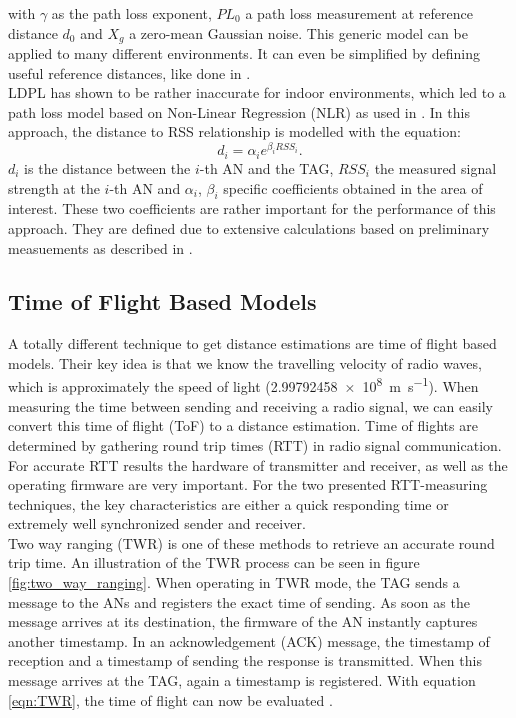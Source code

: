 with $\gamma$ as the path loss exponent, $PL_{0}$ a path loss measurement at reference distance $d_0$ and $X_{g}$ a zero-mean Gaussian noise. This generic model can be applied to many different environments. It can even be simplified by defining useful reference distances, like done in \cite{Kurt}.\\
\noindent\hspace*{5mm}%
LDPL has shown to be rather inaccurate for indoor environments, which led to a path loss model based on Non-Linear Regression (NLR) as used in \cite{ZanLi}. In this approach, the distance to RSS relationship is modelled with the equation:
\begin{equation}
d_{i} = \alpha_{i} e^{\beta_{i}RSS_{i}}.
\label{eqn:NLR}
\end{equation}
$d_{i}$ is the distance between the $i$-th AN and the TAG, $RSS_{i}$ the measured signal strength at the $i$-th AN and $\alpha_{i}$, $\beta_{i}$ specific coefficients obtained in the area of interest. These two coefficients are rather important for the performance of this approach. They are defined due to extensive calculations based on preliminary measuements as described in \cite{Kurt}.


\subsection{Time of Flight Based Models}
A totally different technique to get distance estimations are time of flight based models. Their key idea is that we know the travelling velocity of radio waves, which is approximately the speed of light (\SI{2.99792458e8}{\meter\per\second}). When measuring the time between sending and receiving a radio signal, we can easily convert this time of flight (ToF) to a distance estimation. Time of flights are determined by gathering round trip times (RTT) in radio signal communication. For accurate RTT results the hardware of transmitter and receiver, as well as the operating firmware are very important. For the two presented RTT-measuring techniques, the key characteristics are either a quick responding time or extremely well synchronized sender and receiver.\\
\noindent\hspace*{5mm}%
Two way ranging (TWR) is one of these methods to retrieve an accurate round trip time. An illustration of the TWR process can be seen in figure \ref{fig:two_way_ranging}. When operating in TWR mode, the TAG sends a message to the ANs and registers the exact time of sending. As soon as the message arrives at its destination, the firmware of the AN instantly captures another timestamp. In an acknowledgement (ACK) message, the timestamp of reception and a timestamp of sending the response is transmitted. When this message arrives at the TAG, again a timestamp is registered. With equation \ref{eqn:TWR}, the time of flight can now be evaluated \cite{SewioTWR}.


